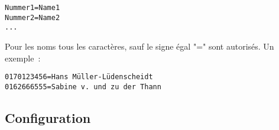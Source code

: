 \begin{small}
\begin{example}
\begin{verbatim}
Nummer1=Name1
Nummer2=Name2
...
\end{verbatim}
\end{example}
\end{small}

Pour les noms tous les caractères, sauf le signe égal "=" sont autorisés. Un exemple~:

\begin{small}
\begin{example}
\begin{verbatim}
0170123456=Hans Müller-Lüdenscheidt
0162666555=Sabine v. und zu der Thann
\end{verbatim}
\end{example}
\end{small}


\subsection {Configuration}

